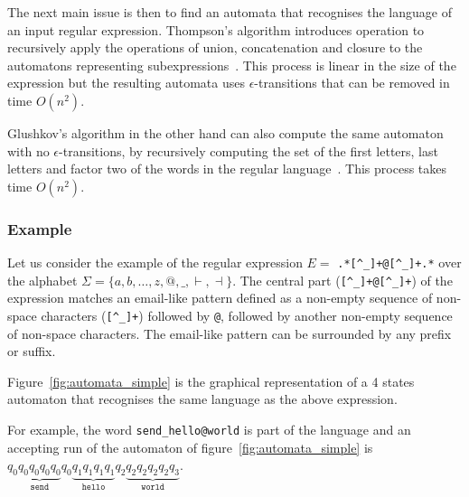 \documentclass[12px]{article}
\begin{document}
        \vspace{0.5cm}

        The next main issue is then to find an automata that recognises the
        language of an input regular expression. Thompson's algorithm
        introduces operation to recursively apply the operations of union,
        concatenation and closure to the automatons representing
        subexpressions~\cite{thompson1968programming}. This process is linear
        in the size of the expression but the resulting automata uses
        $\epsilon$-transitions that can be removed in time $O(n^2)$.

        Glushkov's algorithm in the other hand can also compute the same
        automaton with no $\epsilon$-transitions, by recursively computing the
        set of the first letters, last letters and factor two of the words in
        the regular language~\cite{glushkov1961abstract}. This process takes time $O(n^2)$.

      \subsubsection{Example}%
        \label{sec:example_simple}

        Let us consider the example of the regular expression $E =$
        \texttt{.*[\textasciicircum\_]+@[\textasciicircum\_]+.*} over the
        alphabet $\Sigma = \{a, b, \ldots, z, @, \texttt \_, \vdash, \dashv\}$.
        The central part (\texttt{[\textasciicircum\_]+@[\textasciicircum\_]+})
        of the expression matches an email-like pattern defined as a non-empty
        sequence of non-space characters (\texttt{[\textasciicircum\_]+})
        followed by \texttt{@}, followed by another non-empty sequence of
        non-space characters. The email-like pattern can be surrounded by any
        prefix or suffix.

        Figure~\ref{fig:automata_simple} is the graphical representation of a 4
        states automaton that recognises the same language as the above
        expression.

        For example, the word \texttt{send\_hello@world} is part of the
        language and an accepting run of the automaton of
        figure~\ref{fig:automata_simple} is $q_0 \underbrace{q_0 q_0 q_0
        q_0}_\texttt{send} q_0 \underbrace{q_1q_1q_1q_1}_\texttt{hello} q_2
        \underbrace{q_2 q_2 q_2 q_2 q_3}_\texttt{world}$.
\end{document}
